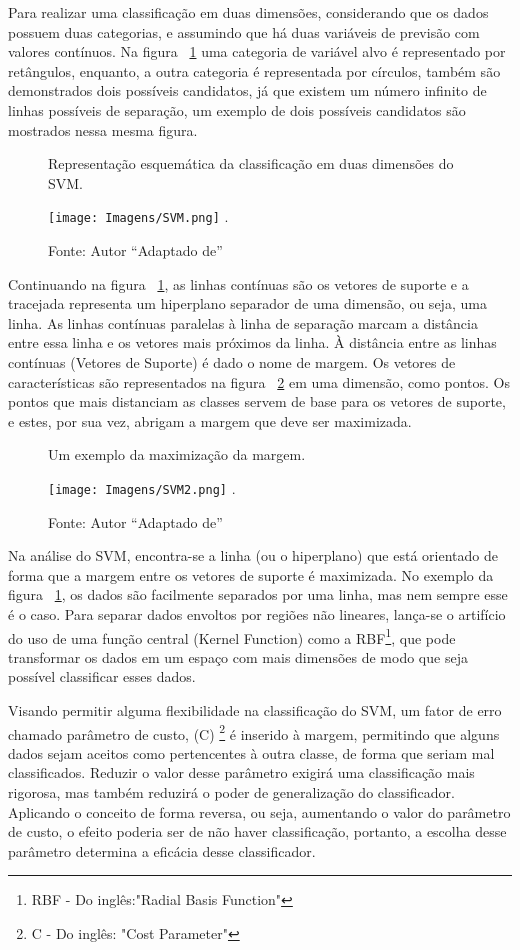 Para realizar uma classificação em duas dimensões, considerando que os dados possuem duas categorias, e assumindo que há duas variáveis de previsão com valores contínuos. Na figura ~\ref{Fig:SVM1} uma categoria de variável alvo é representado por retângulos, enquanto, a outra categoria é representada por círculos, também são demonstrados dois possíveis candidatos, já que existem um número infinito de linhas possíveis de separação, um exemplo de dois possíveis candidatos são mostrados nessa mesma figura.

\begin{figure}[!h]
\centering \caption{Representação esquemática da classificação em duas dimensões do SVM.}
\texttt{[image: Imagens/SVM.png]}
\DeclareGraphicsExtensions.
\caption*{Fonte: Autor ``Adaptado de'' }
\label{Fig:SVM1}
\end{figure}

Continuando na figura ~\ref{Fig:SVM1}, as linhas contínuas são os vetores de suporte e a tracejada representa um hiperplano separador de uma dimensão, ou seja, uma linha. As linhas contínuas paralelas à linha de separação marcam a distância entre essa linha e os vetores mais próximos da linha. À distância entre as linhas contínuas (Vetores de Suporte) é dado o nome de margem. Os vetores de características são representados na figura ~\ref{Fig:SVM2} em uma dimensão, como pontos. Os pontos que mais distanciam as classes servem de base para os vetores de suporte, e estes, por sua vez, abrigam a margem que deve ser maximizada.

\begin{figure}[!ht]
\centering \caption{Um exemplo da maximização da margem.}
\texttt{[image: Imagens/SVM2.png]}
\DeclareGraphicsExtensions.
\caption*{Fonte: Autor ``Adaptado de'' }
\label{Fig:SVM2}
\end{figure}

Na análise do SVM, encontra-se a linha (ou o hiperplano) que está orientado de forma que a margem entre os vetores de suporte é maximizada. No exemplo da figura ~\ref{Fig:SVM1}, os dados são facilmente separados por uma linha, mas nem sempre esse é o caso. Para separar dados envoltos por regiões não lineares, lança-se o artifício do uso de uma função central (Kernel Function) como a RBF\footnote{RBF - Do inglês:"Radial Basis Function"}, que pode transformar os dados em um espaço com mais dimensões de modo que seja possível classificar esses dados. 
 
Visando permitir alguma flexibilidade na classificação do SVM, um fator de erro chamado parâmetro de custo, (C) \footnote{C - Do inglês: "Cost Parameter"} é inserido à margem, permitindo que alguns dados sejam aceitos como pertencentes à outra classe, de forma que seriam mal classificados. Reduzir o valor desse parâmetro exigirá uma classificação mais rigorosa, mas também reduzirá o poder de generalização do classificador. Aplicando o conceito de forma reversa, ou seja, aumentando o valor do parâmetro de custo, o efeito poderia ser de não haver classificação, portanto, a escolha desse parâmetro determina a eficácia desse classificador.

